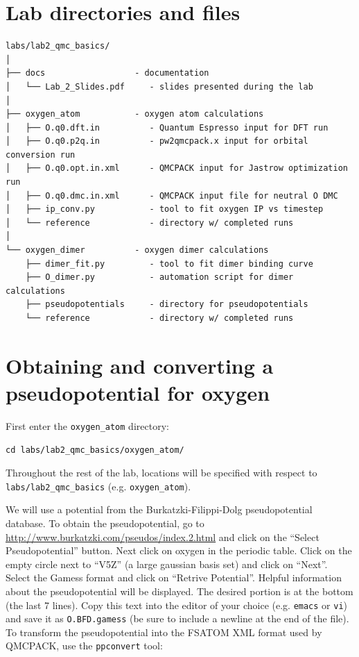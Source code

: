 \section{Lab directories and files}

\begin{shaded}
\begin{verbatim}
labs/lab2_qmc_basics/
│
├── docs                  - documentation 
│   └── Lab_2_Slides.pdf     - slides presented during the lab
│
├── oxygen_atom           - oxygen atom calculations 
│   ├── O.q0.dft.in          - Quantum Espresso input for DFT run
│   ├── O.q0.p2q.in          - pw2qmcpack.x input for orbital conversion run
│   ├── O.q0.opt.in.xml      - QMCPACK input for Jastrow optimization run
│   ├── O.q0.dmc.in.xml      - QMCPACK input file for neutral O DMC
│   ├── ip_conv.py           - tool to fit oxygen IP vs timestep
│   └── reference            - directory w/ completed runs
│
└── oxygen_dimer          - oxygen dimer calculations
    ├── dimer_fit.py         - tool to fit dimer binding curve
    ├── O_dimer.py           - automation script for dimer calculations
    ├── pseudopotentials     - directory for pseudopotentials
    └── reference            - directory w/ completed runs
\end{verbatim}
\end{shaded}





\section{Obtaining and converting a pseudopotential for oxygen}
\label{sec:lqb_pseudo}
First enter the \texttt{oxygen\_atom} directory:
\begin{shaded}
\begin{verbatim}
cd labs/lab2_qmc_basics/oxygen_atom/
\end{verbatim}
\end{shaded}
\noindent
Throughout the rest of the lab, locations will be specified with respect to \texttt{labs/lab2\_qmc\_basics} (e.g. \texttt{oxygen\_atom}).

We will use a potential from the Burkatzki-Filippi-Dolg pseudopotential database.  To obtain the pseudopotential, go to 
\href{http://www.burkatzki.com/pseudos/index.2.html}{http://www.burkatzki.com/pseudos/index.2.html}
and click on the ``Select Pseudopotential'' button.  Next click on oxygen in the 
periodic table.  Click on the empty circle next to ``V5Z'' (a large gaussian 
basis set) and click on ``Next''.  Select the Gamess format and click on 
``Retrive Potential''.  Helpful information about the pseudopotential will be 
displayed.  The desired portion is at the bottom (the last 7 lines).  Copy 
this text into the editor of your choice (e.g. \texttt{emacs} or \texttt{vi}) 
and save it as \texttt{O.BFD.gamess} 
(be sure to include a newline at the end of the file).  To transform the 
pseudopotential into the FSATOM XML format used by QMCPACK, use the \texttt{ppconvert} 
tool:


